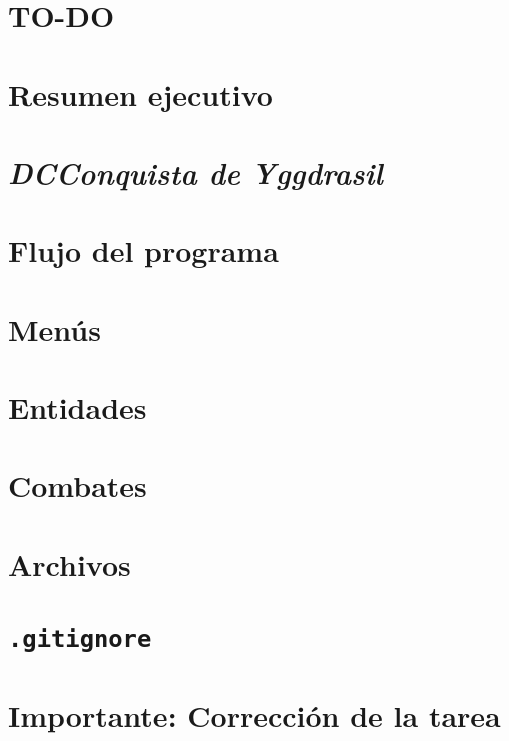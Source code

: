 \documentclass{iic2233homework}
\newcommand{\programa}{\textit{DCConquista de Yggdrasil}\xspace}
\begin{document}
\section*{TO-DO}


\section{Resumen ejecutivo}


\section{\programa}


\section{Flujo del programa}


\section{Menús}


\section{Entidades}


\section{Combates}


\section{Archivos}




\section{\texttt{.gitignore}}


\section{\textbf{Importante:} Corrección de la tarea}

\end{document}
